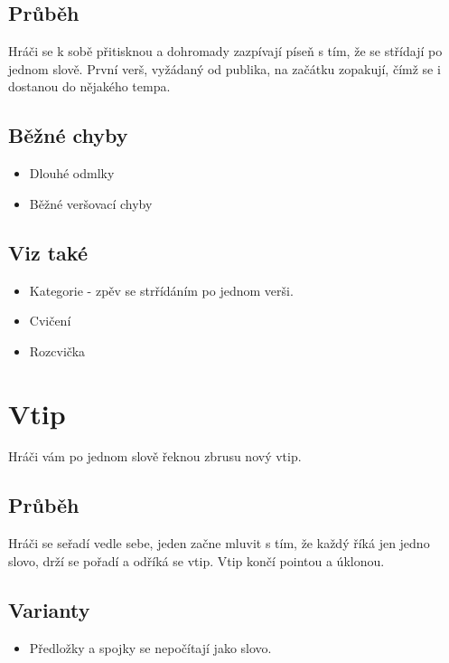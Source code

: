 \subsection{Průběh} Hráči se k sobě přitisknou a dohromady zazpívají píseň s tím, že se střídají po jednom slově. První verš, vyžádaný od publika, na začátku zopakují, čímž se i dostanou do nějakého tempa.  
 
\subsection{Běžné chyby} \begin{itemize}
\item Dlouhé odmlky
\item Běžné veršovací chyby
\end{itemize}
 
\subsection{Viz také} \begin{itemize}
\item Kategorie  - zpěv se strřídáním po jednom verši.
\item Cvičení 
\item Rozcvička 
\end{itemize}
 
 
 
 
\needspace{5cm} \section{Vtip} \label{vtip}  
Hráči vám po jednom slově řeknou zbrusu nový vtip. 
\subsection{Průběh} Hráči se seřadí vedle sebe, jeden začne mluvit s tím, že každý říká jen jedno slovo, drží se pořadí a odříká se vtip.  Vtip končí pointou a úklonou. 
\subsection{Varianty} \begin{itemize}
\item Předložky a spojky se nepočítají jako slovo.
\end{itemize}
 
